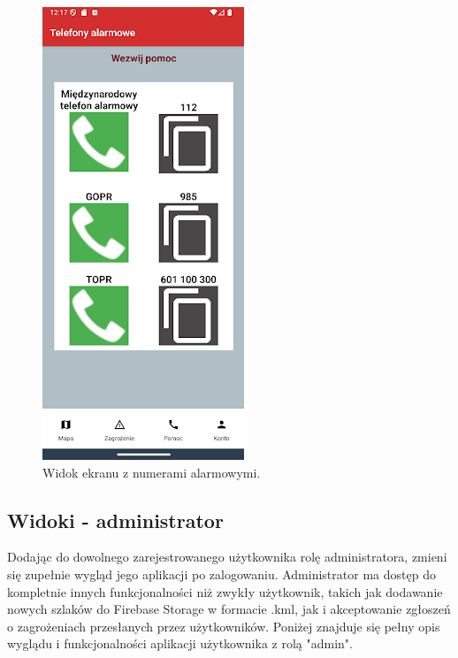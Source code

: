 \begin{figure}[H]
    \centering
    \includegraphics[scale=0.70]{img/imp/widok-telefony.png}
    \caption{Widok ekranu z numerami alarmowymi.}
    \label{widok:telefony}
\end{figure}

\subsection{Widoki - administrator}
Dodając do dowolnego zarejestrowanego użytkownika rolę administratora, zmieni się zupełnie wygląd jego aplikacji po zalogowaniu. Administrator ma dostęp do kompletnie innych funkcjonalności niż zwykły użytkownik, takich jak dodawanie nowych szlaków do Firebase Storage w formacie .kml, jak i akceptowanie zgłoszeń o zagrożeniach przesłanych przez użytkowników. Poniżej znajduje się pełny opis wyglądu i funkcjonalności aplikacji użytkownika z rolą "admin".

